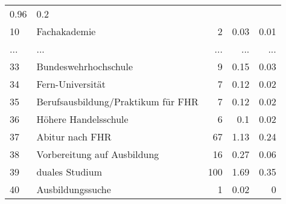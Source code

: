 \begin{longtable}{lXrrr}
          \num[round-mode=places,round-precision=2]{0.96} &
          \num[round-mode=places,round-precision=2]{0.2} \\
        10 & \multicolumn{1}{X}{Fachakademie} & %
          \num{2} &
          \num[round-mode=places,round-precision=2]{0.03} &
          \num[round-mode=places,round-precision=2]{0.01} \\
       ... & ... & ... & ... & ... \\
        33 & \multicolumn{1}{X}{Bundeswehrhochschule} & %
          \num{9} &
          \num[round-mode=places,round-precision=2]{0.15} &
          \num[round-mode=places,round-precision=2]{0.03} \\

        34 & \multicolumn{1}{X}{Fern-Universität} & %
          \num{7} &
          \num[round-mode=places,round-precision=2]{0.12} &
          \num[round-mode=places,round-precision=2]{0.02} \\

        35 & \multicolumn{1}{X}{Berufsausbildung/Praktikum für FHR} & %
          \num{7} &
          \num[round-mode=places,round-precision=2]{0.12} &
          \num[round-mode=places,round-precision=2]{0.02} \\

        36 & \multicolumn{1}{X}{Höhere Handelsschule} & %
          \num{6} &
          \num[round-mode=places,round-precision=2]{0.1} &
          \num[round-mode=places,round-precision=2]{0.02} \\

        37 & \multicolumn{1}{X}{Abitur nach FHR} & %
          \num{67} &
          \num[round-mode=places,round-precision=2]{1.13} &
          \num[round-mode=places,round-precision=2]{0.24} \\

        38 & \multicolumn{1}{X}{Vorbereitung auf Ausbildung} & %
          \num{16} &
          \num[round-mode=places,round-precision=2]{0.27} &
          \num[round-mode=places,round-precision=2]{0.06} \\

        39 & \multicolumn{1}{X}{duales Studium} & %
          \num{100} &
          \num[round-mode=places,round-precision=2]{1.69} &
          \num[round-mode=places,round-precision=2]{0.35} \\

        40 & \multicolumn{1}{X}{Ausbildungssuche} & %
          \num{1} &
          \num[round-mode=places,round-precision=2]{0.02} &
          \num[round-mode=places,round-precision=2]{0} \\


\end{longtable}
